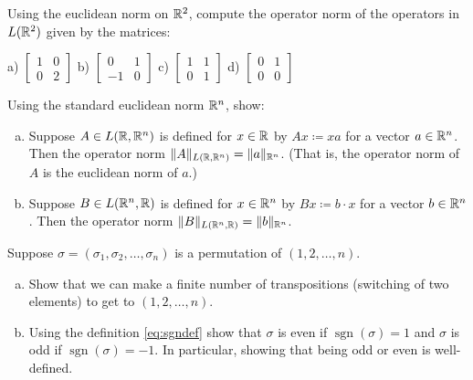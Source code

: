 \begin{exercise}
\pagebreak[3]
Using the euclidean norm on ${\mathbb{R}}^2$, compute the operator norm of the
operators in $L({\mathbb{R}}^2)$ given by the matrices:

\medskip
\noindent
a)
$\left[
\begin{smallmatrix}
1 & 0 \\
0 & 2
\end{smallmatrix}
\right]$
\quad
b)
$\left[
\begin{smallmatrix}
0 & 1 \\
-1 & 0
\end{smallmatrix}
\right]$
\quad
c)
$\left[
\begin{smallmatrix}
1 & 1 \\
0 & 1
\end{smallmatrix}
\right]$
\quad
d)
$\left[
\begin{smallmatrix}
0 & 1 \\
0 & 0
\end{smallmatrix}
\right]$
\end{exercise}


\begin{exercise} \label{exercise:normonedim}
\pagebreak[2]
Using the standard euclidean norm ${\mathbb{R}}^n$, show:
\begin{enumerate}[a)]
\item
Suppose $A \in L({\mathbb{R}},{\mathbb{R}}^n)$ is defined for $x \in {\mathbb{R}}$ by $Ax \coloneqq xa$
for a vector $a \in {\mathbb{R}}^n$.
Then the operator norm $\lVert {A} \rVert_{L({\mathbb{R}},{\mathbb{R}}^n)} = \lVert {a} \rVert_{{\mathbb{R}}^n}$.
(That is, the operator norm of $A$ is the euclidean norm of $a$.)
\item
Suppose $B \in L({\mathbb{R}}^n,{\mathbb{R}})$ is defined for $x \in {\mathbb{R}}^n$ by $Bx \coloneqq b \cdot x$
for a vector $b \in {\mathbb{R}}^n$.
Then the operator norm $\lVert {B} \rVert_{L({\mathbb{R}}^n,{\mathbb{R}})} = \lVert {b} \rVert_{{\mathbb{R}}^n}$.
\end{enumerate}
\end{exercise}

\begin{exercise}
Suppose $\sigma = (\sigma_1,\sigma_2,\ldots,\sigma_n)$ is a permutation of
$(1,2,\ldots,n)$.
\begin{enumerate}[a)]
\item
Show that we can make a finite number of transpositions (switching of two
elements) to get to $(1,2,\ldots,n)$.
\item
Using the definition \eqref{eq:sgndef}
show that $\sigma$ is even if $\operatorname{sgn}(\sigma) = 1$ and $\sigma$
is odd if $\operatorname{sgn}(\sigma) = -1$.  In particular, showing that
being odd or even is well-defined.
\end{enumerate}
\end{exercise}

